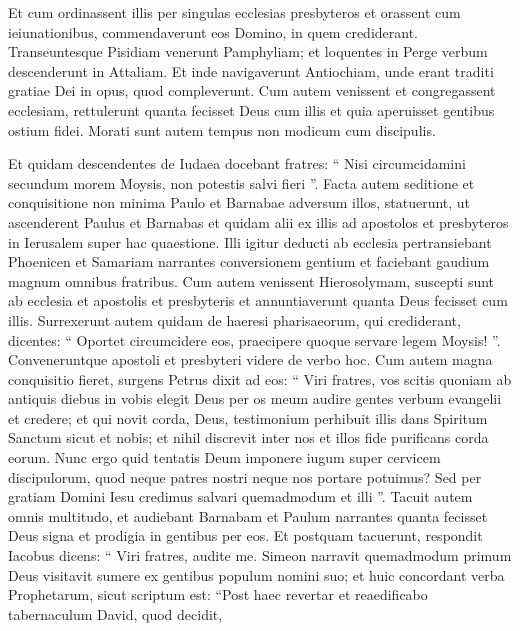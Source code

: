 \begin{biblechapter}
\begin{biblechapter}
\begin{biblechapter}
\begin{biblechapter}
\begin{biblechapter}
\begin{biblechapter}
\begin{biblechapter}
\begin{biblechapter}
\begin{biblechapter}
\begin{biblechapter}
\begin{biblechapter}
\begin{biblechapter}
\begin{biblechapter}
\begin{biblechapter}
\verse Et cum ordinassent illis per singulas ecclesias presbyteros et orassent cum ieiunationibus, commendaverunt eos Domino, in quem crediderant. 
\verse Transeuntesque Pisidiam venerunt Pamphyliam; 
\verse et loquentes in Perge verbum descenderunt in Attaliam. 
\verse Et inde navigaverunt Antiochiam, unde erant traditi gratiae Dei in opus, quod compleverunt.
 \verse Cum autem venissent et congregassent ecclesiam, rettulerunt quanta fecisset Deus cum illis et quia aperuisset gentibus ostium fidei. 
\verse Morati sunt autem tempus non modicum cum discipulis.
 
\begin{biblechapter}
\verse Et quidam descendentes de Iudaea docebant fratres: “ Nisi circumcidamini secundum morem Moysis, non potestis salvi fieri ”.
 \verse Facta autem seditione et conquisitione non minima Paulo et Barnabae adversum illos, statuerunt, ut ascenderent Paulus et Barnabas et quidam alii ex illis ad apostolos et presbyteros in Ierusalem super hac quaestione. 
\verse Illi igitur deducti ab ecclesia pertransiebant Phoenicen et Samariam narrantes conversionem gentium et faciebant gaudium magnum omnibus fratribus. 
\verse Cum autem venissent Hierosolymam, suscepti sunt ab ecclesia et apostolis et presbyteris et annuntiaverunt quanta Deus fecisset cum illis. 
\verse Surrexerunt autem quidam de haeresi pharisaeorum, qui crediderant, dicentes: “ Oportet circumcidere eos, praecipere quoque servare legem Moysis! ”.
 \verse Conveneruntque apostoli et presbyteri videre de verbo hoc. 
\verse Cum autem magna conquisitio fieret, surgens Petrus dixit ad eos: “ Viri fratres, vos scitis quoniam ab antiquis diebus in vobis elegit Deus per os meum audire gentes verbum evangelii et credere; 
\verse et qui novit corda, Deus, testimonium perhibuit illis dans Spiritum Sanctum sicut et nobis; 
\verse et nihil discrevit inter nos et illos fide purificans corda eorum. 
\verse Nunc ergo quid tentatis Deum imponere iugum super cervicem discipulorum, quod neque patres nostri neque nos portare potuimus? 
\verse Sed per gratiam Domini Iesu credimus salvari quemadmodum et illi ”.
 \verse Tacuit autem omnis multitudo, et audiebant Barnabam et Paulum narrantes quanta fecisset Deus signa et prodigia in gentibus per eos. 
\verse Et postquam tacuerunt, respondit Iacobus dicens: “ Viri fratres, audite me. 
\verse Simeon narravit quemadmodum primum Deus visitavit sumere ex gentibus populum nomini suo; 
\verse et huic concordant verba Prophetarum, sicut scriptum est:
 \verse “Post haec revertar
 et reaedificabo tabernaculum David, quod decidit,

\end{biblechapter}
\end{biblechapter}
\end{biblechapter}
\end{biblechapter}
\end{biblechapter}
\end{biblechapter}
\end{biblechapter}
\end{biblechapter}
\end{biblechapter}
\end{biblechapter}
\end{biblechapter}
\end{biblechapter}
\end{biblechapter}
\end{biblechapter}
\end{biblechapter}
